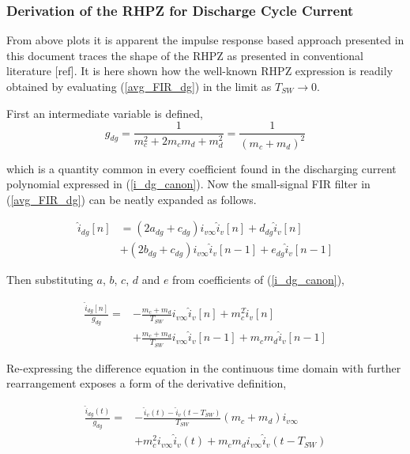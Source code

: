 \documentclass[conference]{IEEEtran}
\begin{document}
\subsubsection {Derivation of the RHPZ for Discharge Cycle Current}
From above plots it is apparent the impulse response based approach presented in this document traces the shape of the RHPZ as presented in conventional literature [ref]. It is here shown how the well-known RHPZ expression is readily obtained by evaluating (\ref{avg_FIR_dg}) in the limit as $T_{SW} \to 0$.

First an intermediate variable is defined,
\begin{equation}
g_{dg} = \frac{1}{m_c^2+2m_cm_d+m_d^2} = \frac{1}{(m_c + m_d)^2}
\end{equation} 

which is a quantity common in every coefficient found in the discharging current polynomial expressed in (\ref{i_dg_canon}). Now the small-signal FIR filter in (\ref{avg_FIR_dg}) can be neatly expanded as follows.

\begin{align}
\hat{i}_{dg}[n] & = (2a_{dg}+c_{dg})i_{v\infty} \hat{i}_{v}[n] + d_{dg} \hat{i}_{v}[n] \nonumber \\
 & +(2b_{dg}+c_{dg})i_{v\infty} \hat{i}_v[n-1] + e_{dg} \hat{i}_{v}[n-1]
\label{avg_FIR_dg_expanded}
\end{align}

Then substituting $a$, $b$, $c$, $d$ and $e$ from coefficients of (\ref{i_dg_canon}),

 \begin{align}
 \frac{\hat{i}_{dg}[n]}{g_{dg}} = &-\frac{m_c + m_d}{T_{SW}} i_{v\infty} \hat{i}_{v}[n] + m_c^2 \hat{i}_v[n] \nonumber \\ 
 &+ \frac{m_c + m_d}{T_{SW}} i_{v\infty} \hat{i}_v[n-1] + m_c m_d \hat{i}_v[n-1]
 \label{avg_FIR_dg_expanded_coeffs}
 \end{align}
 
Re-expressing the difference equation in the continuous time domain with further rearrangement exposes a form of the derivative definition,

\begin{align}
	\frac{\hat{i}_{dg}(t)}{g_{dg}} =&  -\frac{\hat{i}_v(t) - \hat{i}_v (t-T_{SW})} {T_{SW}}
	(m_c + m_d) i_{v\infty} \nonumber \\
	&+	m_c^2 i_{v\infty}  \hat{i}_v(t)
	+ m_c m_d i_{v\infty}  \hat{i}_v(t-T_{SW})
	\label{idg_t_differential_def}
\end{align}
\end{document}
